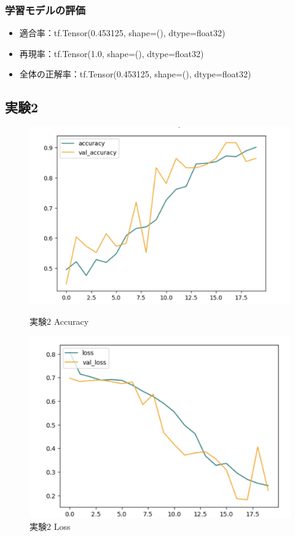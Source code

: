 \documentclass[a4paper, 11pt, titlepage]{jsarticle}
\begin{document}
\subsubsection{学習モデルの評価}

\begin{itemize}
\item 適合率：tf.Tensor(0.453125, shape=(), dtype=float32)
\item 再現率：tf.Tensor(1.0, shape=(), dtype=float32) 
\item 全体の正解率：tf.Tensor(0.453125, shape=(), dtype=float32)
\end{itemize}


\subsection{実験2}
\begin{figure}[htbp]
  \begin{minipage}[b]{0.45\linewidth}
    \centering
    \includegraphics[keepaspectratio, scale=0.33]{ex2_acc.png}
    \caption{実験2 Accuracy}
  \end{minipage}
  \begin{minipage}[b]{0.45\linewidth}
    \centering
    \includegraphics[keepaspectratio, scale=0.33]{ex2_loss.png}
    \caption{実験2 Loss}
  \end{minipage}
\end{figure}
\end{document}
